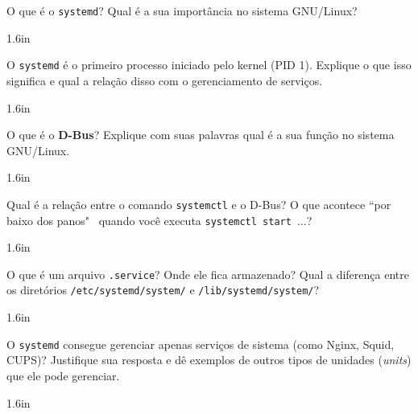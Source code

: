 \documentclass[12pt]{exam}
\begin{document}
\begin{questions}

\question O que é o \texttt{systemd}? Qual é a sua importância no sistema GNU/Linux?

\begin{solutionbox}{1.6in} \end{solutionbox}

\question O \texttt{systemd} é o primeiro processo iniciado pelo kernel (PID 1). Explique o que isso significa e qual a relação disso com o gerenciamento de serviços.

\begin{solutionbox}{1.6in} \end{solutionbox}

\question O que é o \textbf{D-Bus}? Explique com suas palavras qual é a sua função no sistema GNU/Linux.

\begin{solutionbox}{1.6in} \end{solutionbox}

\question Qual é a relação entre o comando \texttt{systemctl} e o D-Bus? O que acontece ``por baixo dos panos"~ quando você executa \texttt{systemctl start $\ldots$}?


\begin{solutionbox}{1.6in} \end{solutionbox}

\question O que é um arquivo \texttt{.service}? Onde ele fica armazenado? Qual a diferença entre os diretórios \texttt{/etc/systemd/system/} e \texttt{/lib/systemd/system/}?

\begin{solutionbox}{1.6in} \end{solutionbox}


\question O \texttt{systemd} consegue gerenciar apenas serviços de sistema (como Nginx, Squid, CUPS)? Justifique sua resposta e dê exemplos de outros tipos de unidades (\textit{units}) que ele pode gerenciar.

\begin{solutionbox}{1.6in} \end{solutionbox}


%


\end{questions}
\end{document}
